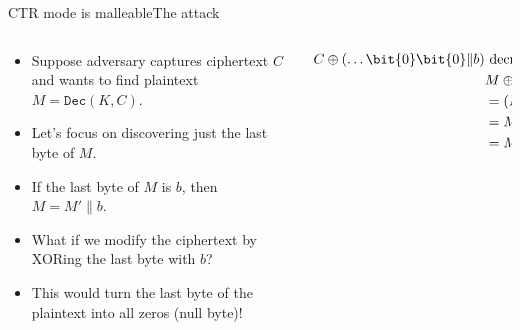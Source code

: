 \documentclass[aspectratio=169, lualatex, handout]{beamer}
\begin{document}
\begin{frame}{CTR mode is malleable}{The attack}
	\begin{columns}[c]
		\begin{column}{0.5\textwidth}
			\begin{itemize}
				\item Suppose adversary captures ciphertext $C$ and wants to find plaintext $M = \texttt{Dec}(K, C)$.
				\item Let's focus on discovering just the last byte of $M$.
				\item If the last byte of $M$ is $b$, then $M = M' \| b$.
				\item What if we modify the ciphertext by XORing the last byte with $b$?
				\item This would turn the last byte of the plaintext into all zeros (null byte)!
			\end{itemize}
		\end{column}
		\begin{column}{0.5\textwidth}
			\begin{align*}
				C \oplus (\ldots \bit{0}\bit{0} \| b) & \text{ decrypts to:}                            \\
				                                      & M \oplus (\ldots \bit{0}\bit{0} \| b)           \\
				                                      & = (M' \| b) \oplus (\ldots \bit{0}\bit{0} \| b) \\
				                                      & = M' \| (b \oplus b)                            \\
				                                      & = M' \| \bit{0}\bit{0}
			\end{align*}
		\end{column}
	\end{columns}
\end{frame}
\end{document}

